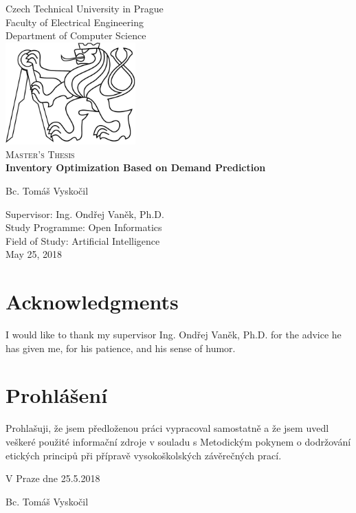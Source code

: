 \documentclass[11pt,a4paper]{article}
\begin{document}

\begin{titlepage}
	\begin{center}
		Czech Technical University in Prague \\
		Faculty of Electrical Engineering \\
		Department of Computer Science \\[1cm]
		\includegraphics[width=5cm]{figures/lev.pdf}~\\[1.5cm]
		\textsc{\large Master's Thesis}\\[0.5cm]
		
		{\LARGE \bfseries Inventory Optimization Based on Demand Prediction \\[1cm] }

		{\Large Bc. Tomáš Vyskočil \\[1cm]}

		\vfill 
		Supervisor: Ing. Ondřej Vaněk, Ph.D. \\[1cm]
		Study Programme: Open Informatics \\[0.25cm]
		Field of Study: Artificial Intelligence \\[0.25cm]
		May 25, 2018
		
		
	\end{center}
\end{titlepage}

\newpage
{}
\section*{Acknowledgments}
I would like to thank my supervisor Ing. Ondřej Vaněk, Ph.D. for the advice he has given me, for his patience, and his sense of humor. 


\vfill
\section*{Prohlášení}
Prohlašuji, že jsem předloženou práci vypracoval samostatně a že jsem uvedl veškeré použité informační zdroje v souladu s Metodickým pokynem o dodržování etických principů při přípravě vysokoškolských závěrečných prací. \newline \newline \newline
\noindent
\begin{minipage}[t]{0.4\textwidth}
\begin{flushleft} 
V Praze dne 25.5.2018
\end{flushleft}
\end{minipage}
\begin{minipage}[t]{0.4\textwidth}
\begin{flushright}
Bc. Tomáš Vyskočil
\end{flushright}
\end{minipage}
\end{document}
